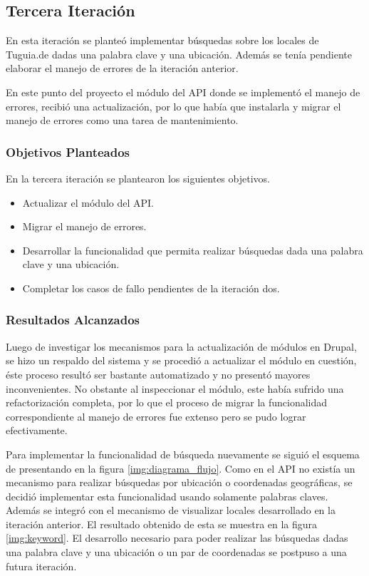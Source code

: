  
\subsection{Tercera Iteración}

En esta iteración se planteó implementar búsquedas sobre los locales de Tuguia.de dadas una palabra clave y una ubicación. Además se tenía pendiente elaborar el manejo de errores de la iteración anterior.

En este punto del proyecto el módulo del API donde se implementó el manejo de errores, recibió una actualización, por lo que había que instalarla y migrar el manejo de errores como una tarea de mantenimiento.

\subsubsection{Objetivos Planteados} 
En la tercera iteración se plantearon los siguientes objetivos.
\begin{itemize}
\item Actualizar el módulo del API.
\item Migrar el manejo de errores.
\item Desarrollar la funcionalidad que permita realizar búsquedas dada una palabra clave y una ubicación.
\item Completar los casos de fallo pendientes de la iteración dos.
\end{itemize}

\subsubsection{Resultados Alcanzados}

Luego de investigar los mecanismos para la actualización de módulos en Drupal, se hizo un respaldo del sistema y se procedió a actualizar el módulo en cuestión, éste proceso resultó ser bastante automatizado y no presentó mayores inconvenientes. No obstante al inspeccionar el módulo, este había sufrido una refactorización completa, por lo que el proceso de migrar la funcionalidad correspondiente al manejo de errores fue extenso pero se pudo lograr efectivamente.

Para implementar la funcionalidad de búsqueda nuevamente se siguió el esquema de presentando en la figura \ref{img:diagrama_flujo}. Como en el API no existía un mecanismo para realizar búsquedas por  ubicación o coordenadas geográficas, se decidió implementar esta funcionalidad usando solamente palabras claves. Además se integró con el mecanismo de visualizar locales desarrollado en la iteración anterior. El resultado obtenido de esta se muestra en la figura \ref{img:keyword}. El desarrollo necesario para poder realizar las búsquedas dadas una palabra clave y una ubicación o un par de coordenadas se postpuso a una futura iteración.

